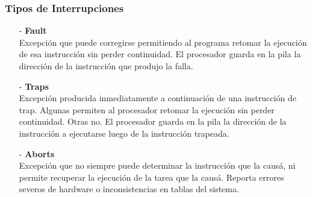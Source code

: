 \documentclass[aspectratio=169]{beamer}
\begin{document}
\begin{frame}
    \frametitle{Tipos de Interrupciones}
    \begin{itemize}
    \setlength\itemsep{0.3cm}
    \item[-] \textbf{Fault}\\ Excepción que puede corregirse permitiendo al programa
    retomar la ejecución de esa instrucción sin perder continuidad.
    El procesador guarda en la pila la dirección de la instrucción
    que produjo la falla.
    \pause
    \item[-] \textbf{Traps}\\ Excepción producida inmediatamente a continuación de 
    una instrucción de trap. Algunas permiten al procesador retomar la
    ejecución sin perder continuidad. Otras no. El procesador guarda en
    la pila la dirección de la instrucción a ejecutarse luego de la
    instrucción trapeada.
    \pause
    \item[-] \textbf{Aborts}\\ Excepción que no siempre puede determinar la
    instrucción que la causá, ni permite recuperar la ejecución de
    la tarea que la causá. Reporta errores severos de hardware o
    inconsistencias en tablas del sistema.
    \end{itemize}
\end{frame}
\end{document}
